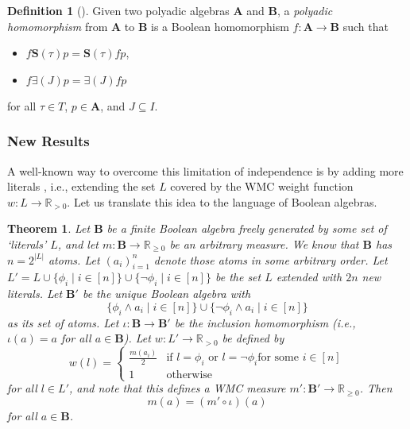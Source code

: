 \documentclass{article}
\newtheorem{theorem}{Theorem}
\theoremstyle{definition}
\newtheorem{definition}{Definition}
\theoremstyle{remark}
\begin{document}
\begin{definition}[\cite{halmos2016algebraic}]
  Given two polyadic algebras $\mathbf{A}$ and $\mathbf{B}$, a \emph{polyadic
    homomorphism} from $\mathbf{A}$ to $\mathbf{B}$ is a Boolean homomorphism $f
  : \mathbf{A} \to \mathbf{B}$ such that
  \begin{itemize}
  \item $f\mathbf{S}(\tau)p = \mathbf{S}(\tau)fp$,
  \item $f\bm\exists(J)p = \bm\exists(J)fp$
  \end{itemize}
  for all $\tau \in T$, $p \in \mathbf{A}$, and $J \subseteq I$.
\end{definition}

\subsubsection{New Results}

A well-known way to overcome this limitation of independence is by adding more
literals \cite{DBLP:journals/ai/ChaviraD08}, i.e., extending the set $L$ covered
by the WMC weight function $w : L \to \mathbb{R}_{>0}$. Let us translate this
idea to the language of Boolean algebras.

\begin{theorem} \label{thm:extension} %
  Let $\mathbf{B}$ be a finite Boolean algebra freely generated by some set of
  `literals' $L$, and let $m : \mathbf{B} \to \mathbb{R}_{\ge 0}$ be an
  arbitrary measure. We know that $\mathbf{B}$ has $n = 2^{|L|}$ atoms. Let
  $(a_i)_{i=1}^n$ denote those atoms in some arbitrary order. Let $L' = L \cup
  \{ \phi_i \mid i \in [n] \} \cup \{ \neg \phi_i \mid i \in [n] \}$ be the set
  $L$ extended with $2n$ new literals. Let $\mathbf{B'}$ be the unique Boolean
  algebra with
  \[
    \{ \phi_i \land a_i \mid i \in [n] \} \cup \{ \neg \phi_i \land a_i \mid i
    \in [n] \}
  \]
  as its set of atoms. Let $\iota : \mathbf{B} \to \mathbf{B'}$ be the inclusion
  homomorphism (i.e., $\iota(a) = a$ for all $a \in \mathbf{B}$). Let $w : L'
  \to \mathbb{R}_{> 0}$ be defined by
  \[
    w(l) = \begin{cases}
      \frac{m(a_i)}{2} & \text{if } l = \phi_i \text{ or } l = \neg\phi_i \text{
        for some } i \in [n] \\
      1 & \text{otherwise}
    \end{cases}
  \]
  for all $l \in L'$, and note that this defines a WMC measure $m' : \mathbf{B'}
  \to \mathbb{R}_{\ge 0}$. Then
  \[
    m(a) = (m' \circ \iota)(a)
  \]
  for all $a \in \mathbf{B}$.
\end{theorem}
\end{document}
